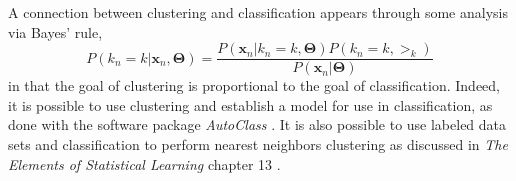 A connection between clustering and classification appears through some analysis via Bayes' rule,
\begin{equation}\label{Bayes}
 P(k_n=k|\bm x_n, \bm\Theta) =\dfrac{ P(\bm x_n|k_n=k,\bm\Theta)P(k_n=k, \bm\gt_k) }{P(\bm x_n|\bm\Theta)}
\end{equation}
in that the goal of clustering is proportional to the goal of classification.  Indeed, it is possible to use clustering and establish a model for use in classification, as done with the software package \textit{AutoClass} \cite{AutoClass1,AutoClass2}.  It is also possible to use labeled data sets and classification to perform nearest neighbors clustering as discussed in \textit{The Elements of Statistical Learning} chapter 13 \cite{hastie09esl}. 

